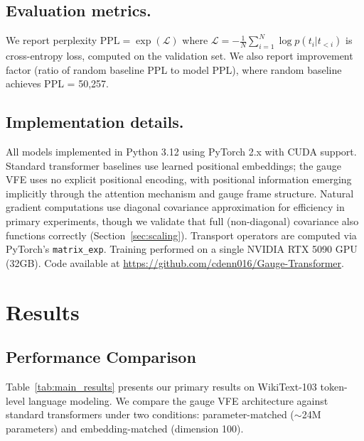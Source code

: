 \documentclass[twoside,11pt]{article}
\begin{document}
\subsection{Evaluation metrics.}

We report perplexity $\text{PPL} = \exp(\mathcal{L})$ where $\mathcal{L} = -\frac{1}{N}\sum_{i=1}^N \log p(t_i | t_{<i})$ is cross-entropy loss, computed on the validation set. We also report improvement factor (ratio of random baseline PPL to model PPL), where random baseline achieves PPL = 50,257.

\subsection{Implementation details.}

All models implemented in Python 3.12 using PyTorch 2.x with CUDA support. Standard transformer baselines use learned positional embeddings; the gauge VFE uses no explicit positional encoding, with positional information emerging implicitly through the attention mechanism and gauge frame structure. Natural gradient computations use diagonal covariance approximation for efficiency in primary experiments, though we validate that full (non-diagonal) covariance also functions correctly (Section~\ref{sec:scaling}). Transport operators are computed via PyTorch's \texttt{matrix\_exp}. Training performed on a single NVIDIA RTX 5090 GPU (32GB). Code available at \url{https://github.com/cdenn016/Gauge-Transformer}.



\section{Results}
\label{sec:results}

\subsection{Performance Comparison}
\label{sec:performance}

Table~\ref{tab:main_results} presents our primary results on WikiText-103 token-level language modeling. We compare the gauge VFE architecture against standard transformers under two conditions: parameter-matched ($\sim$24M parameters) and embedding-matched (dimension 100).
\end{document}
